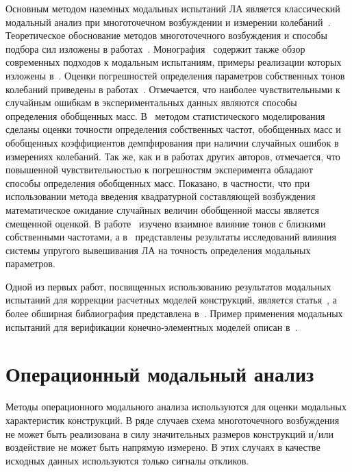 Основным методом наземных модальных испытаний ЛА является классический модальный анализ при многоточечном возбуждении и измерении колебаний~\cite{lib:ema:Karklje:GVT}. Теоретическое обоснование методов многоточечного возбуждения и способы подбора сил изложены в работах~\cite{lib:ema:Dat, lib:ema:Dat&Tretout&Lafont, lib:ema:Mikishev, lib:ema:Smyslov, lib:ema:Heilen, lib:ema:Berns:identification}. Монография~\cite{lib:ema:Heilen} содержит также обзор современных подходов к модальным испытаниям, примеры реализации которых изложены в~\cite{lib:ema:Boswald, lib:ema:Brillhart, lib:ema:Peres, lib:ema:Peter, lib:ema:Pickrel}. Оценки погрешностей определения параметров собственных тонов колебаний приведены в работах~\cite{lib:ema:Smyslov, lib:ema:Vasiliev, lib:ema:Zharov, lib:ema:Ushkalov}. Отмечается, что наиболее чувствительными к случайным ошибкам в экспериментальных данных являются способы определения обобщенных масс. В~\cite{lib:ema:Berns:estimate} методом статистического моделирования сделаны оценки точности определения собственных частот, обобщенных масс и обобщенных коэффициентов демпфирования при наличии случайных ошибок в измерениях колебаний. Так же, как и в работах других авторов, отмечается, что повышенной чувствительностью к погрешностям эксперимента обладают способы определения обобщенных масс. Показано, в частности, что при использовании метода введения квадратурной составляющей возбуждения математическое ожидание случайных величин обобщенной массы является смещенной оценкой. В работе~\cite{lib:ema:Berns:errors} изучено взаимное влияние тонов с близкими собственными частотами, а в~\cite{lib:ema:Berns:support} представлены результаты исследований влияния системы упругого вывешивания ЛА на точность определения модальных параметров. 

Одной из первых работ, посвященных использованию результатов модальных испытаний для коррекции расчетных моделей конструкций, является статья~\cite{lib:ema:Baruch}, а более обширная библиография представлена в~\cite{lib:ema:Heilen}. Пример применения модальных испытаний для верификации конечно-элементных моделей описан в~\cite{lib:ema:Mezhin}.

\section{Операционный модальный анализ}

Методы операционного модального анализа используются для оценки модальных характеристик конструкций. В ряде случаев схема многоточечного возбуждения не может быть реализована в силу значительных размеров конструкций и/или воздействие не может быть напрямую измерено. В этих случаях в качестве исходных данных используются только сигналы откликов. 

